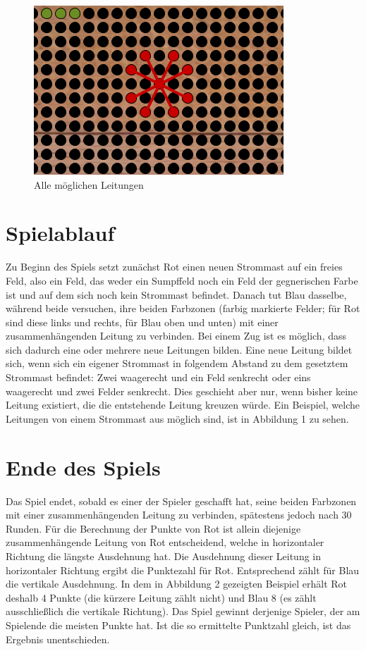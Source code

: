 \documentclass[a4paper, ngerman]{scrartcl}
\begin{document}
\begin{figure}[h!]
		\centering
		\includegraphics[scale = 0.8]{bilder/setzzug.png}
		\caption{Alle möglichen Leitungen}
		\label{fig:Leitungen}
\end{figure}
	
\section{Spielablauf}	 
Zu Beginn des Spiels setzt zunächst Rot einen neuen Strommast auf ein
freies Feld, also ein Feld, das weder ein Sumpffeld noch ein Feld der
gegnerischen Farbe ist und auf dem sich noch kein Strommast befindet. 
Danach tut Blau dasselbe, während beide versuchen,
ihre beiden Farbzonen (farbig markierte Felder; für Rot sind diese links und
rechts, für Blau  oben und unten) mit einer zusammenhängenden Leitung zu
verbinden.
Bei einem Zug ist es möglich, dass sich dadurch eine oder mehrere
neue Leitungen bilden. Eine neue Leitung bildet sich, wenn sich ein eigener
Strommast in folgendem Abstand zu dem gesetztem Strommast befindet: Zwei
waagerecht und ein Feld senkrecht oder eins waagerecht und zwei Felder
senkrecht. Dies geschieht aber nur, wenn bisher keine Leitung existiert, die
die entstehende Leitung kreuzen würde.
Ein Beispiel, welche Leitungen von einem Strommast aus möglich sind, ist
in Abbildung 1 zu sehen.
	 
	
\section{Ende des Spiels} 
Das Spiel endet, sobald es einer der Spieler geschafft hat, seine beiden
Farbzonen mit einer zusammenhängenden Leitung zu verbinden, spätestens jedoch
nach 30 Runden.
Für die Berechnung der Punkte von Rot ist allein diejenige zusammenhängende
Leitung von Rot entscheidend, welche in horizontaler Richtung die längste Ausdehnung
hat. Die Ausdehnung dieser Leitung in horizontaler Richtung ergibt die Punktezahl
für Rot. Entsprechend zählt für Blau die vertikale Ausdehnung.
In dem in Abbildung 2 gezeigten Beispiel erhält Rot deshalb 4 Punkte
(die kürzere Leitung zählt nicht) und Blau 8 (es zählt ausschließlich
die vertikale Richtung). Das Spiel gewinnt derjenige Spieler, der am Spielende die
meisten Punkte hat.
Ist die so ermittelte Punktzahl gleich, ist das Ergebnis unentschieden.
\end{document}

